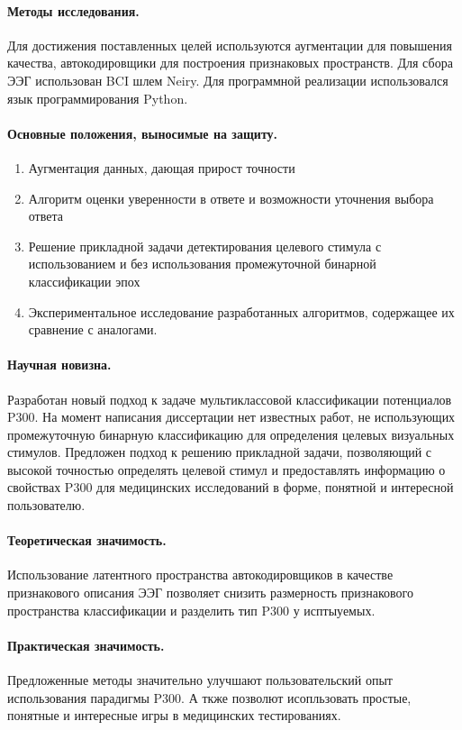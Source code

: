 \documentclass[12pt]{article}
\begin{document}
	
	\paragraph{Методы исследования.}
	Для достижения поставленных целей используются аугментации для повышения качества, автокодировщики для построения признаковых пространств. Для сбора ЭЭГ использован BCI шлем Neiry. Для программной реализации использовался язык программирования Python.
	
	
	
	\paragraph{Основные положения, выносимые на защиту.}
	\begin{enumerate}
		\item Аугментация данных, дающая прирост точности
		\item Алгоритм оценки уверенности в ответе и возможности уточнения выбора ответа
		\item Решение прикладной задачи детектирования целевого стимула с использованием и без использования промежуточной бинарной классификации эпох
		\item Экспериментальное исследование разработанных алгоритмов, содержащее их сравнение с аналогами.
	\end{enumerate}
	
	
	
	\paragraph{Научная новизна.}
	Разработан новый подход к задаче мультиклассовой классификации потенциалов P300. На момент написания диссертации нет известных работ, не использующих промежуточную бинарную классификацию для определения целевых визуальных стимулов. Предложен подход к решению прикладной задачи, позволяющий с высокой точностью определять целевой стимул и предоставлять информацию о свойствах P300 для медицинских исследований в форме, понятной и интересной пользователю.
	
	
	\paragraph{Теоретическая значимость.}
	Использование латентного пространства автокодировщиков в качестве признакового описания ЭЭГ позволяет снизить размерность признакового пространства классификации и разделить тип P300 у исптыуемых.
	\paragraph{Практическая значимость.}
	Предложенные методы значительно улучшают пользовательский опыт использования парадигмы P300.
	А ткже позволют  исопльзовать простые, понятные и интересные игры в медицинских тестированиях.
	
\end{document}

